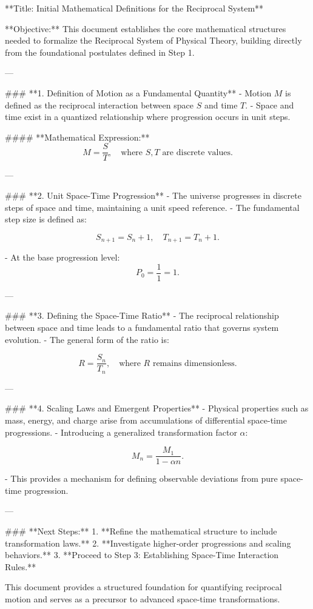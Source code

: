 **Title: Initial Mathematical Definitions for the Reciprocal System**

**Objective:**
This document establishes the core mathematical structures needed to formalize the Reciprocal System of Physical Theory, building directly from the foundational postulates defined in Step 1.

---

### **1. Definition of Motion as a Fundamental Quantity**
- Motion \( M \) is defined as the reciprocal interaction between space \( S \) and time \( T \).
- Space and time exist in a quantized relationship where progression occurs in unit steps.

#### **Mathematical Expression:**
\[
M = \frac{S}{T}, \quad \text{where } S, T \text{ are discrete values.}
\]

---

### **2. Unit Space-Time Progression**
- The universe progresses in discrete steps of space and time, maintaining a unit speed reference.
- The fundamental step size is defined as:

\[
 S_{n+1} = S_n + 1, \quad T_{n+1} = T_n + 1.
\]

- At the base progression level:
\[
 P_0 = \frac{1}{1} = 1.
\]

---

### **3. Defining the Space-Time Ratio**
- The reciprocal relationship between space and time leads to a fundamental ratio that governs system evolution.
- The general form of the ratio is:

\[
 R = \frac{S_n}{T_n}, \quad \text{where } R \text{ remains dimensionless.}
\]

---

### **4. Scaling Laws and Emergent Properties**
- Physical properties such as mass, energy, and charge arise from accumulations of differential space-time progressions.
- Introducing a generalized transformation factor \( \alpha \):

\[
 M_n = \frac{M_1}{1 - \alpha n}.
\]

- This provides a mechanism for defining observable deviations from pure space-time progression.

---

### **Next Steps:**
1. **Refine the mathematical structure to include transformation laws.**
2. **Investigate higher-order progressions and scaling behaviors.**
3. **Proceed to Step 3: Establishing Space-Time Interaction Rules.**

This document provides a structured foundation for quantifying reciprocal motion and serves as a precursor to advanced space-time transformations.

